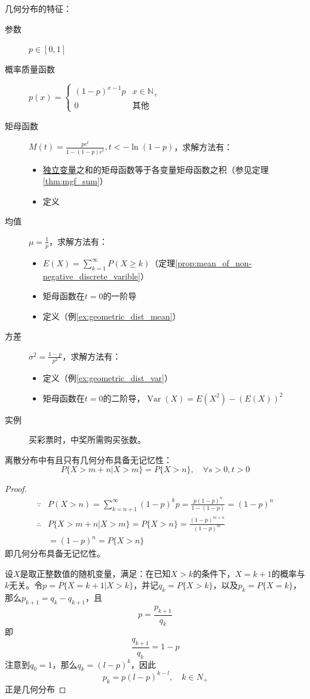 几何分布的特征：
\begin{description}
    \item[参数] $p \in [0,1]$
    \item[概率质量函数] $p(x)=\begin{cases}
                (1-p)^{x-1} p & x \in \mathbb{N}_+ \\
                0             & \text{其他}
            \end{cases}$
    \item[矩母函数] $M(t)=\frac{p e^t}{1-(1-p)e^t}, t<-\ln (1-p)$，求解方法有：
        \begin{itemize}
            \item \underline{独立变量}之和的矩母函数等于各变量矩母函数之积（参见定理\ref{thm:mgf_sum}）
            \item 定义
        \end{itemize}
    \item[均值] $\mu=\frac{1}{p}$，求解方法有：
        \begin{itemize}
            \item $E(X)=\sum_{k=1}^{\infty}P(X\ge k)$（定理\ref{prop:mean_of_non-negative_discrete_varible}）
            \item 矩母函数在$t=0$的一阶导
            \item 定义（例\ref{ex:geometric_dist_mean}）
        \end{itemize}
    \item[方差] $\sigma^2=\frac{1-p}{p^2}$，求解方法有：
        \begin{itemize}
            \item 定义（例\ref{ex:geometric_dist_var}）
            \item 矩母函数在$t=0$的二阶导，$\operatorname{Var}(X)=E(X^2)-(E(X))^2$
        \end{itemize}
    \item[实例] 买彩票时，中奖所需购买张数。
\end{description}

\begin{proposition}
    离散分布中有且只有几何分布具备无记忆性：
    \[ P\{ X>m+n|X>m \} =P\{ X>n \} ,\quad \forall s>0,t>0\]
\end{proposition}
\begin{proof}
    \begin{align*}
        \because   & P(X>n)=\sum_{k=n+1}^{\infty}(1-p)^k p=\frac{p(1-p)^n}{1-(1-p)}=(1-p)^n \\
        \therefore & P\{ X>m+n|X>m \} =P\{ X>n \}=\frac{(1-p)^{m+n}}{(1-p)^m}               \\
                   & =(1-p)^n=P\{ X>n \}
    \end{align*}
    即几何分布具备无记忆性。

    设$X$是取正整数值的随机变量，满足：在已知$X>k$的条件下，$X=k+1$的概率与$k$无关。令$p=P\{ X=k+1|X>k \}$，并记$q_k=P\{ X>k \}$，以及$p_k=P\{ X=k \}$，那么$p_{k+1}=q_k-q_{k+1}$，且
    \[ p=\frac{p_{k+1}}{q_k} \]
    即
    \[ \frac{q_{k+1}}{q_k}=1-p \]
    注意到$q_0=1$，那么$q_k=(l-p)^k$，因此
    \[ p_k=p(l-p)^{k-l},\quad k \in N_+ \]
    正是几何分布
\end{proof}

